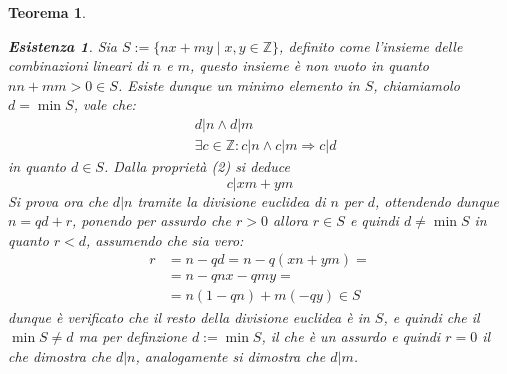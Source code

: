 \documentclass{article}
\makeatletter
\renewenvironment{proof}[1][\proofname]{\par
    \pushQED{\qed}%
    \normalfont \topsep6\p@\@plus6\p@\relax
    \trivlist
    \item\relax
    {\itshape
    #1\@addpunct{.}}\hspace\labelsep\ignorespaces
    }{%
    \popQED\endtrivlist\@endpefalse
}
\newtheorem{theorem}{Teorema}[part]
\theoremstyle{definition}
\newtheorem*{existence}{Esistenza}
\makeatother
\begin{document}
\begin{theorem}
\begin{proof}
\begin{existence}
            Sia \(S:=\{nx+my\mid x,y\in\mathbb{Z}\}\), definito come l'insieme delle combinazioni lineari di \(n\) e \(m\), questo insieme è non vuoto in quanto \(nn+mm>0\in S\).
            Esiste dunque un minimo elemento in \(S\), chiamiamolo \(d=\min S\), vale che: 
            \[
                \begin{aligned}
                    &d|n \wedge d|m\\
                    &\exists c\in\mathbb{Z}: c|n \wedge c|m \Rightarrow c|d
                \end{aligned}
            \]
            in quanto \(d\in S\).
            Dalla proprietà (2) si deduce \[c|xm+ym\]
            Si prova ora che \(d|n\) tramite la divisione euclidea di \(n\) per \(d\), ottendendo dunque \(n=qd+r\), ponendo per assurdo che \(r>0\) allora \(r\in S\) e quindi \(d\neq \min S\) in quanto \(r<d\), assumendo che sia vero:
            \[
                \begin{aligned}
                    r&=n-qd=n-q(xn+ym)=\\
                    &=n-qnx-qmy=\\
                    &=n(1-qn)+m(-qy)\in S
                \end{aligned}
            \]
            dunque è verificato che il resto della divisione euclidea è in \(S\), e quindi che il \(\min S\neq d\) ma per definzione \(d:=\min S\), il che è un assurdo e quindi \(r=0\) il che dimostra che \(d|n\), analogamente si dimostra che \(d|m\).
        \end{existence}
        \raggedleft{\pushQED{\ensuremath{\blacksquare}}}
    \end{proof}
\end{theorem}
\end{document}
